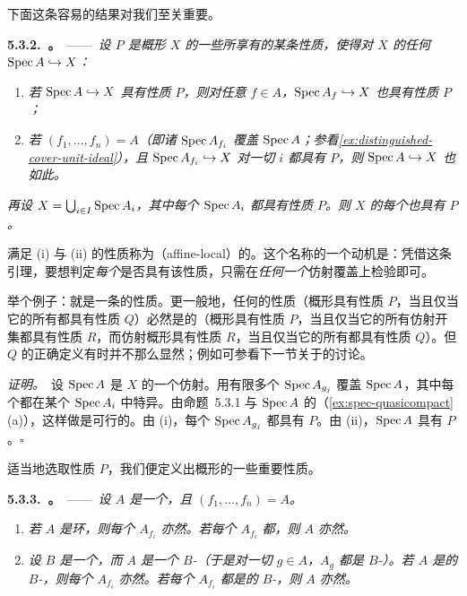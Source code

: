 下面这条容易的结果对我们至关重要。

\textbf{5.3.2.\ \trAffineCommunicationLemma。}\ ——\ \emph{设 $P$ 是概形 $X$ 的一些\trAffine\trOpenSubscheme{}所享有的某条性质，使得对 $X$ 的任何\trAffine\trOpenSubscheme{} $\operatorname{Spec} A\hookrightarrow X$：}
\begin{enumerate}[label=(\roman*)]
  \item \emph{若 $\operatorname{Spec} A\hookrightarrow X$ 具有性质 $P$，则对任意 $f\in A$，$\operatorname{Spec} A_f\hookrightarrow X$ 也具有性质 $P$；}
  \item \emph{若 $(f_1,\dots,f_n)=A$（即诸 $\operatorname{Spec} A_{f_i}$ 覆盖 $\operatorname{Spec} A$；参看\cref{ex:distinguished-cover-unit-ideal}），且 $\operatorname{Spec} A_{f_i}\hookrightarrow X$ 对一切 $i$ 都具有 $P$，则 $\operatorname{Spec} A\hookrightarrow X$ 也如此。}
\end{enumerate}
\emph{再设 $X=\bigcup_{i\in I}\operatorname{Spec} A_i$，其中每个 $\operatorname{Spec} A_i$ 都具有性质 $P$。则 $X$ 的每个\trAffine\trOpenSubscheme{}也具有 $P$。}

满足 (i) 与 (ii) 的性质称为\textbf{\trAffineLocal{}}（affine-local）的。这个名称的一个动机是：凭借这条引理，要想判定\emph{每个}\trAffine\trOpenSubscheme{}是否具有该性质，只需在\emph{任何一个}仿射覆盖上检验即可。

举个例子：\trReducedness{}就是一条\trAffineLocal{}的性质。更一般地，任何\trStalkLocal{}的性质（概形具有性质 $P$，当且仅当它的所有\trStalk{}都具有性质 $Q$）必然是\trAffineLocal{}的（概形具有性质 $P$，当且仅当它的所有仿射开集都具有性质 $R$，而仿射概形具有性质 $R$，当且仅当它的所有\trStalk{}都具有性质 $Q$）。但 $Q$ 的正确定义有时并不那么显然；例如可参看下一节关于\trNormality{}的讨论。

\emph{证明。}\ 设 $\operatorname{Spec} A$ 是 $X$ 的一个仿射\trSubscheme{}。用有限多个\trDistinguishedOpen{} $\operatorname{Spec} A_{g_j}$ 覆盖 $\operatorname{Spec} A$，其中每个都在某个 $\operatorname{Spec} A_i$ 中特异。由命题~5.3.1 与 $\operatorname{Spec} A$ 的\trQuasicompactness{}（\cref{ex:spec-quasicompact}(a)），这样做是可行的。由 (i)，每个 $\operatorname{Spec} A_{g_j}$ 都具有 $P$。由 (ii)，$\operatorname{Spec} A$ 具有 $P$。\hfill$\square$

适当地选取性质 $P$，我们便定义出概形的一些重要性质。

\textbf{5.3.3.\ \trhProposition{}。}\ ——\ \emph{设 $A$ 是一个\trRing，且 $(f_1,\dots,f_n)=A$。}
\begin{enumerate}[label=(\alph*)]
  \item \emph{若 $A$ 是\trNoetherian{}环，则每个 $A_{f_i}$ 亦然。若每个 $A_{f_i}$ 都\trNoetherian，则 $A$ 亦然。}
  \item \emph{设 $B$ 是一个\trRing，而 $A$ 是一个 $B$-\trAlgebra（于是对一切 $g\in A$，$A_g$ 都是 $B$-\trAlgebra）。若 $A$ 是\trFinitelyGenerated{}的 $B$-\trAlgebra，则每个 $A_{f_i}$ 亦然。若每个 $A_{f_i}$ 都是\trFinitelyGenerated{}的 $B$-\trAlgebra，则 $A$ 亦然。}
\end{enumerate}

